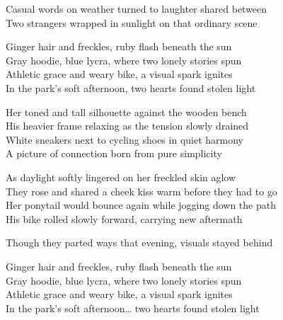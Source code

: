 \begin{lyrics}
Casual words on weather turned to laughter shared between\\
Two strangers wrapped in sunlight on that ordinary scene

Ginger hair and freckles, ruby flash beneath the sun\\
Gray hoodie, blue lycra, where two lonely stories spun\\
Athletic grace and weary bike, a visual spark ignites\\
In the park’s soft afternoon, two hearts found stolen light

Her toned and tall silhouette against the wooden bench\\
His heavier frame relaxing as the tension slowly drained\\
White sneakers next to cycling shoes in quiet harmony\\
A picture of connection born from pure simplicity

As daylight softly lingered on her freckled skin aglow\\
They rose and shared a cheek kiss warm before they had to go\\
Her ponytail would bounce again while jogging down the path\\
His bike rolled slowly forward, carrying new aftermath

Though they parted ways that evening, visuals stayed behind

Ginger hair and freckles, ruby flash beneath the sun\\
Gray hoodie, blue lycra, where two lonely stories spun\\
Athletic grace and weary bike, a visual spark ignites\\
In the park’s soft afternoon… two hearts found stolen light

\end{lyrics}

